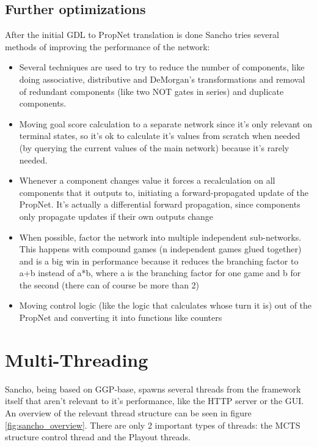 \subsection{Further optimizations}
After the initial GDL to PropNet translation is done Sancho tries several methods of improving the performance of the network:
\begin{itemize}
	\item Several techniques are used to try to reduce the number of components, like doing associative, distributive and DeMorgan's transformations and removal of redundant components (like two NOT gates in series) and duplicate components.
	
	\item Moving goal score calculation to a separate network since it's only relevant on terminal states, so it's ok to calculate it's values from scratch when needed (by querying the current values of the main network) because it's rarely needed.
	
	\item Whenever a component changes value it forces a recalculation on all components that it outputs to,  initiating a forward-propagated update of the PropNet.
	It's actually a differential forward propagation, since components only propagate updates if their own outputs change
	
	\item When possible, factor the network into multiple independent sub-networks. This happens with compound games (n independent games glued together) and is a big win in performance because it reduces the branching factor to a+b instead of a*b, where a is the branching factor for one game and b for the second (there can of course be more than 2)
	
	\item Moving control logic (like the logic that calculates whose turn it is) out of the PropNet and converting it into functions like counters
	
\end{itemize}


\section{Multi-Threading}
Sancho, being based on GGP-base, spawns several threads from the framework itself that aren't relevant to it's performance, like the HTTP server or the GUI.
An overview of the relevant thread structure can be seen in figure \ref{fig:sancho_overview}. There are only 2 important types of threads: the MCTS structure control thread and the Playout threads.

